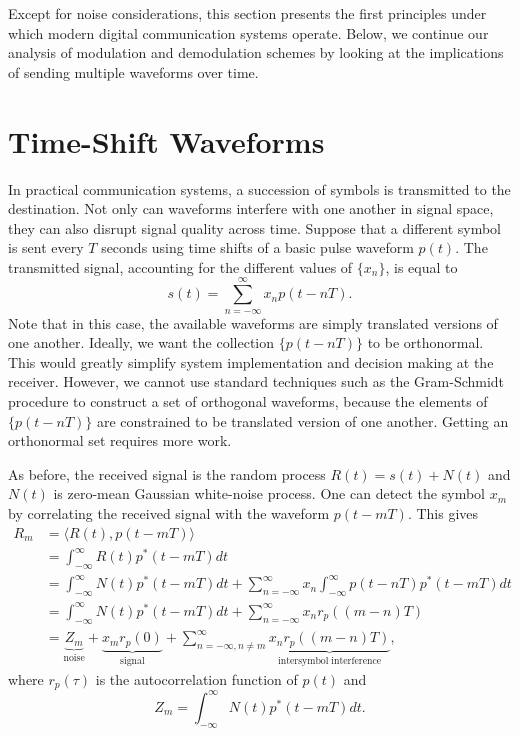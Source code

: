 Except for noise considerations, this section presents the first principles under which modern digital communication systems operate.
Below, we continue our analysis of modulation and demodulation schemes by looking at the implications of sending multiple waveforms over time.
\fi

\section{Time-Shift Waveforms}

In practical communication systems, a succession of symbols is transmitted to the destination.
Not only can waveforms interfere with one another in signal space, they can also disrupt signal quality across time.
Suppose that a different symbol is sent every $T$ seconds using time shifts of a basic pulse waveform $p(t)$.
The transmitted signal, accounting for the different values of $\{ x_n \}$, is equal to
\begin{equation*}
s(t) = \sum_{n = -\infty}^{\infty} x_n p (t - nT) .
\end{equation*}
Note that in this case, the available waveforms are simply translated versions of one another.
Ideally, we want the collection $\{ p(t - nT) \}$ to be orthonormal.
This would greatly simplify system implementation and decision making at the receiver.
However, we cannot use standard techniques such as the Gram-Schmidt procedure to construct a set of orthogonal waveforms, because the elements of $\{ p(t - nT) \}$ are constrained to be translated version of one another.
Getting an orthonormal set requires more work.

As before, the received signal is the random process $R(t) = s(t) + N(t)$ and $N(t)$ is zero-mean Gaussian white-noise process.
One can detect the symbol $x_m$  by correlating the received signal with the waveform $p(t-mT)$.
This gives
\begin{align*}
R_m &= \langle R(t), p (t-mT) \rangle \\
&= \int_{-\infty}^{\infty} R(t) p^* (t-mT) dt \\
&=  \int_{-\infty}^{\infty} N(t) p^* (t-mT) dt +
\sum_{n = -\infty}^{\infty} x_n \int_{-\infty}^{\infty} p(t-nT) p^* (t-mT) dt \\
&=  \int_{-\infty}^{\infty} N(t) p^* (t-mT) dt +
\sum_{n = -\infty}^{\infty} x_n r_p \left( (m-n) T \right) \\
&=  \underbrace{Z_m}_{\mathrm{noise}} + \underbrace{x_m r_p (0)}_{\mathrm{signal}} + \sum_{n = -\infty, n\neq m}^{\infty} \underbrace{x_n r_p \left( (m-n) T \right)}_{\mathrm{intersymbol\;interference}},
\end{align*}
where $r_p (\tau)$ is the autocorrelation function of $p(t)$ and
\[ Z_m =  \int_{-\infty}^{\infty} N(t) p^* (t-mT) dt. \]

